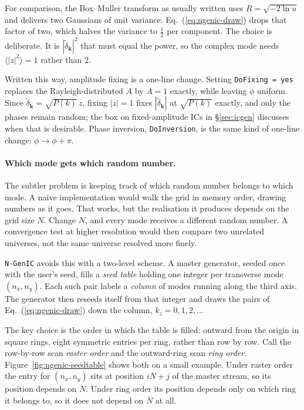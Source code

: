 \documentclass[12pt]{article}
\newcommand{\bk}{\mathbf{k}}
\begin{document}
For comparison, the Box--Muller transform as usually written uses
$R = \sqrt{-2\ln u}$ and delivers two Gaussians of unit variance.
Eq.~(\ref{eq:ngenic-draw}) drops that factor of two, which halves the
variance to $\tfrac12$ per component.  The choice is deliberate.  It is
$|\tilde\delta_\bk|^2$ that must equal the power, so the complex mode
needs $\langle|z|^2\rangle = 1$ rather than $2$.

Written this way, amplitude fixing is a one-line change.  Setting
\texttt{DoFixing = yes} replaces the Rayleigh-distributed $A$ by $A = 1$
exactly, while leaving $\phi$ uniform.  Since $\tilde\delta_\bk =
\sqrt{P(k)}\,z$, fixing $|z| = 1$ fixes $|\tilde\delta_\bk|$ at
$\sqrt{P(k)}$ exactly, and only the phases remain random; the box on
fixed-amplitude ICs in \S\ref{sec:icgen} discusses when that is
desirable.  Phase inversion, \texttt{DoInversion}, is the same kind of
one-line change: $\phi \to \phi + \pi$.

\paragraph{Which mode gets which random number.}
The subtler problem is keeping track of which random number belongs to
which mode.  A naive implementation would walk the grid in memory order,
drawing numbers as it goes.  That works, but the realisation it produces
depends on the grid size $N$.  Change $N$, and every mode receives a
different random number.  A convergence test at higher resolution would
then compare two unrelated universes, not the same universe resolved
more finely.

\texttt{N-GenIC} avoids this with a two-level scheme.  A master
generator, seeded once with the user's seed, fills a \emph{seed table}
holding one integer per transverse mode $(n_x, n_y)$.  Each such pair
labels a \emph{column} of modes running along the third axis.  The
generator then reseeds itself from that integer and draws the pairs of
Eq.~(\ref{eq:ngenic-draw}) down the column, $k_z = 0, 1, 2, \dots$

The key choice is the order in which the table is filled: outward from
the origin in square rings, eight symmetric entries per ring, rather
than row by row.  Call the row-by-row scan \emph{raster order} and the
outward-ring scan \emph{ring order}.  Figure~\ref{fig:ngenic-seedtable}
shows both on a small example.  Under raster order the entry for
$(n_x, n_y)$ sits at position $i N + j$ of the master stream, so its
position depends on $N$.  Under ring order its position depends only on
which ring it belongs to, so it does not depend on $N$ at all.
\end{document}
